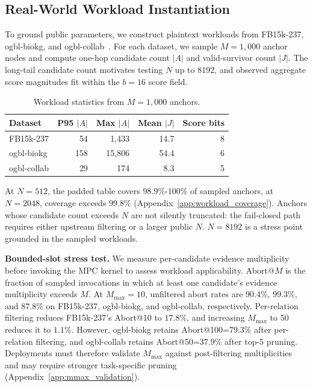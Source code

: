 \documentclass[conference,compsoc,letterpaper]{IEEEtran}
\theoremstyle{definition}
\theoremstyle{remark}
\newcommand{\Mmax}{M_{\max}}
\newcommand{\scorebits}{b}
\begin{document}
\subsection{Real-World Workload Instantiation}
\label{subsec:workload}

To ground public parameters, we construct plaintext workloads from FB15k-237, ogbl-biokg, and ogbl-collab~\cite{toutanova2015fb15k, hu2020ogb}. For each dataset, we sample $M=1{,}000$ anchor nodes and compute one-hop candidate count $|A|$ and valid-survivor count $|J|$.
The long-tail candidate count motivates testing $N$ up to $8192$, and observed aggregate score magnitudes fit within the $\scorebits=16$ score field.
\begin{table}[t]
\centering
\small
\setlength{\tabcolsep}{4pt}
\renewcommand{\arraystretch}{1.08}
\caption{Workload statistics from $M=1{,}000$ anchors.}
\label{tab:workload_stats}
\begin{tabular}{@{}lrrrr@{}}
\toprule
\textbf{Dataset} & \textbf{P95 $|A|$} & \textbf{Max $|A|$} &
\textbf{Mean $|J|$} & \textbf{Score bits} \\
\midrule
FB15k-237   & 54  & 1{,}433  & 14.7 & 8 \\
ogbl-biokg  & 158 & 15{,}806 & 54.4 & 6 \\
ogbl-collab & 29  & 174      & 8.3  & 5 \\
\bottomrule
\end{tabular}
\vspace{-3mm}
\end{table}
At $N=512$, the padded table covers $98.9\%$-$100\%$ of sampled anchors, at $N=2048$, coverage exceeds $99.8\%$ (Appendix~\ref{app:workload_coverage}).
Anchors whose candidate count exceeds $N$ are not silently truncated: the fail-closed path requires either upstream filtering or a larger public $N$. $N=8192$ is a stress point grounded in the sampled workloads.

\smallskip

\noindent\textbf{Bounded-slot stress test.}
We measure per-candidate evidence multiplicity before invoking the MPC kernel to assess workload applicability.
Abort@$M$ is the fraction of sampled invocations in which at least one candidate's evidence multiplicity exceeds $M$.
At $\Mmax=10$, unfiltered abort rates are $90.4\%$, $99.3\%$, and $87.8\%$ on FB15k-237, ogbl-biokg, and ogbl-collab, respectively.
Per-relation filtering reduces FB15k-237's Abort@10 to $17.8\%$, and increasing $\Mmax$ to 50 reduces it to $1.1\%$.
However, ogbl-biokg retains Abort@100=$79.3\%$ after per-relation filtering, and ogbl-collab retains Abort@50=$37.9\%$ after top-5 pruning.
Deployments must therefore validate $\Mmax$ against post-filtering multiplicities and may require stronger task-specific pruning (Appendix~\ref{app:mmax_validation}).
\end{document}
